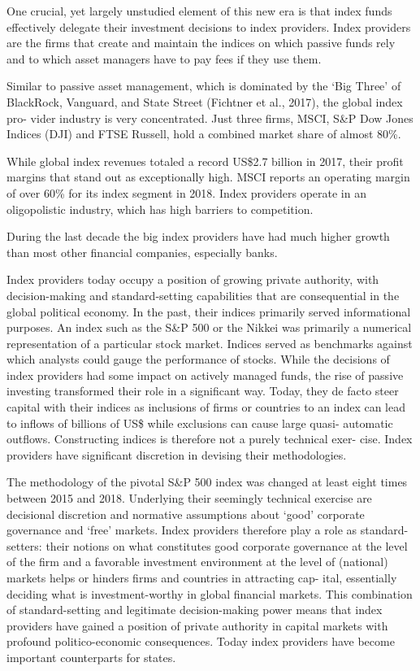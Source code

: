 \documentclass[
]{book}
\begin{document}
One crucial, yet largely unstudied element of this new era is that
index funds effectively delegate their investment decisions to index providers. Index
providers are the firms that create and maintain the indices on which passive funds
rely and to which asset managers have to pay fees if they use them.

Similar to passive asset management, which is dominated by the `Big Three' of
BlackRock, Vanguard, and State Street (Fichtner et al., 2017), the global index pro-
vider industry is very concentrated. Just three firms, MSCI, S\&P Dow Jones Indices
(DJI) and FTSE Russell, hold a combined market share of almost 80\%.

While global index revenues totaled a record US\$2.7 billion in 2017,
their profit margins that stand out as exceptionally high.
MSCI reports an operating margin of over 60\% for its index segment in 2018.
Index providers operate in an oligopolistic industry,
which has high barriers to competition.

During the last decade the big index providers have had
much higher growth than most other financial companies, especially banks.

Index providers today occupy a position of growing
private authority, with decision-making and standard-setting capabilities that are
consequential in the global political economy. In the past, their indices primarily
served informational purposes. An index such as the S\&P 500 or the Nikkei was
primarily a numerical representation of a particular stock market. Indices served as
benchmarks against which analysts could gauge the performance of stocks. While
the decisions of index providers had some impact on actively managed funds, the
rise of passive investing transformed their role in a significant way. Today, they de
facto steer capital with their indices as inclusions of firms or countries to an
index can lead to inflows of billions of US\$ while exclusions can cause large quasi-
automatic outflows. Constructing indices is therefore not a purely technical exer-
cise. Index providers have significant discretion in devising their methodologies.

The methodology of the pivotal S\&P 500
index was changed at least eight times between 2015 and 2018. Underlying their
seemingly technical exercise are decisional discretion and normative assumptions
about `good' corporate governance and `free' markets. Index providers therefore
play a role as standard-setters: their notions on what constitutes good corporate
governance at the level of the firm and a favorable investment environment at the
level of (national) markets helps or hinders firms and countries in attracting cap-
ital, essentially deciding what is investment-worthy in global financial markets.
This combination of standard-setting and legitimate decision-making power means
that index providers have gained a position of private authority in capital markets
with profound politico-economic consequences.
Today index providers have become important counterparts for states.
\end{document}
